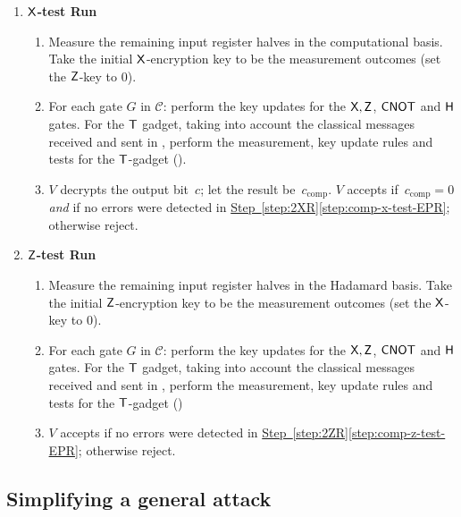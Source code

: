 \documentclass{toc}
\newcommand{\hgate}{{\sf H}}
\newcommand{\rgate}{{\sf T}}
\newcommand{\tgate}{{\sf T}}
\newcommand{\xgate}{{\sf X}}
\newcommand{\zgate}{{\sf Z}}
\newcommand{\cnot}{{\sf CNOT}}
\newcommand{\cC}{\mathcal{C}}
\newcommand{\stepref}[2]{\hyperref[#2]{Step~\ref{#1}\ref{#2}}}
\begin{document}
\begin{proof-system}
\begin{enumerate}
\begin{enumerate}[label=\Alph*.]
\item   \textbf{$\xgate$-test Run}\label{step:2XR}
\begin{enumerate}[label*=\arabic*.,ref=\arabic*]
\item \label{step:input-EPR-X-test} Measure the remaining input register halves in the computational basis. Take the initial $\xgate$-encryption key to be the measurement outcomes (set the $\zgate$-key to 0).
\item \label{step:comp-x-test-EPR} For each gate $G$ in  $\cC$:  perform the key updates for the $\xgate, \zgate$, $\cnot$ and $\hgate$ gates. For the $\rgate$ gadget, taking into account the classical messages received and sent in , perform the measurement, key update rules and tests for the $\tgate$-gadget ().
\item $V$ decrypts the output bit~$c$; let the result be~$c_{\text{comp}}$. $V$ accepts if~$c_{\text{comp}}=0$ \emph{and} if no errors were detected in \stepref{step:2XR}{step:comp-x-test-EPR}; otherwise reject.
\end{enumerate}


\item   \textbf{$\zgate$-test Run}\label{step:2ZR}
\begin{enumerate}[label*=\arabic*.,ref=\arabic*]
\item \label{step:input-EPR-Z-test} Measure the remaining input register halves in the Hadamard basis. Take the initial $\zgate$-encryption key to be the measurement outcomes (set the $\xgate$-key to 0).
\item \label{step:comp-z-test-EPR} For each gate $G$ in  $\cC$:  perform the key updates for the $\xgate, \zgate$, $\cnot$ and $\hgate$ gates. For the $\rgate$ gadget, taking into account the classical messages received and sent in , perform the measurement, key update rules and tests for the $\tgate$-gadget ()
\item  $V$ accepts if no errors were detected in \stepref{step:2ZR}{step:comp-z-test-EPR}; otherwise reject.
\end{enumerate}
\end{enumerate}
\end{enumerate}

\end{proof-system}


\subsection{Simplifying a general attack}
\label{sec:simplifying-general}
\end{document}
